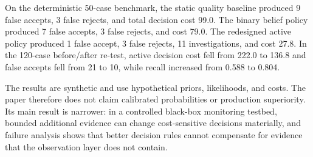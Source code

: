 \documentclass[
]{article}
\begin{document}
On the deterministic 50-case benchmark, the static quality baseline
produced 9 false accepts, 3 false rejects, and total decision cost 99.0.
The binary belief policy produced 7 false accepts, 3 false rejects, and
cost 79.0. The redesigned active policy produced 1 false accept, 3 false
rejects, 11 investigations, and cost 27.8. In the 120-case before/after
re-test, active decision cost fell from 222.0 to 136.8 and false accepts
fell from 21 to 10, while recall increased from 0.588 to 0.804.

The results are synthetic and use hypothetical priors, likelihoods, and
costs. The paper therefore does not claim calibrated probabilities or
production superiority. Its main result is narrower: in a controlled
black-box monitoring testbed, bounded additional evidence can change
cost-sensitive decisions materially, and failure analysis shows that
better decision rules cannot compensate for evidence that the
observation layer does not contain.
\end{document}
